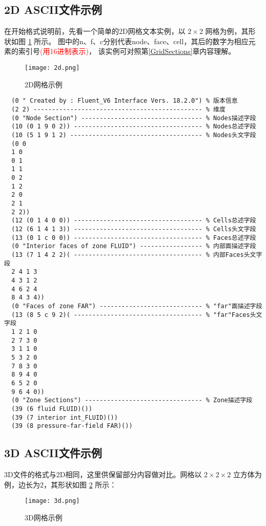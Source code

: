 \documentclass[lang=cn,11pt,a4paper]{elegantpaper} %
\begin{document}
\subsection{2D ASCII文件示例}
在开始格式说明前，先看一个简单的2D网格文本实例，以 $2\times2$ 网格为例，其形状如图 \ref{2dMesh} 所示。
图中的n、f、c分别代表node、face、cell，其后的数字为相应元素的索引号\textcolor{red}{(用16进制表示)}，
该实例可对照第\ref{GridSections}章内容理解。

\begin{figure}[!htb]
  \centering
  \texttt{[image: 2d.png]}
  \caption{2D网格示例}
  \label{2dMesh}
\end{figure}

\begin{lstlisting}
  (0 " Created by : Fluent_V6 Interface Vers. 18.2.0") % 版本信息
  (2 2) ---------------------------------------------- % 维度
  (0 "Node Section") --------------------------------- % Nodes描述字段
  (10 (0 1 9 0 2)) ----------------------------------- % Nodes总述字段
  (10 (5 1 9 1 2) ------------------------------------ % Nodes头文字段
  (0 0
  1 0
  0 1
  1 1
  0 2
  1 2
  2 0
  2 1
  2 2))
  (12 (0 1 4 0 0)) ----------------------------------- % Cells总述字段
  (12 (6 1 4 1 3)) ----------------------------------- % Cells头文字段
  (13 (0 1 c 0 0)) ----------------------------------- % Faces总述字段
  (0 "Interior faces of zone FLUID") ----------------- % 内部面描述字段
  (13 (7 1 4 2 2)( ----------------------------------- % 内部Faces头文字段
  2 4 1 3
  4 3 1 2
  4 6 2 4
  8 4 3 4))
  (0 "Faces of zone FAR") ---------------------------- % "far"面描述字段
  (13 (8 5 c 9 2)( ----------------------------------- % "far"Faces头文字段
  1 2 1 0
  2 7 3 0
  3 1 1 0
  5 3 2 0
  7 8 3 0
  8 9 4 0
  6 5 2 0
  9 6 4 0))
  (0 "Zone Sections") -------------------------------- % Zone描述字段
  (39 (6 fluid FLUID)())
  (39 (7 interior int_FLUID)())
  (39 (8 pressure-far-field FAR)()) 
\end{lstlisting}

\subsection{3D ASCII文件示例}

3D文件的格式与2D相同，这里供保留部分内容做对比。网格以 $2\times2\times2$ 立方体为例，边长为2，其形状如图 \ref{3dMesh} 所示：
\begin{figure}[!htb]
  \centering
  \texttt{[image: 3d.png]}
  \caption{3D网格示例}
  \label{3dMesh}
\end{figure}
\end{document}
